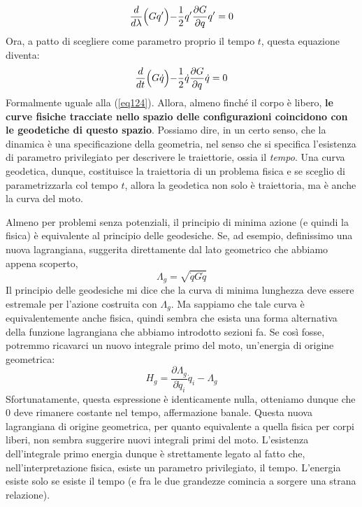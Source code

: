 \documentclass[a4paper,openany]{article}
\begin{document}
	\begin{equation}\label{key}\dfrac{d}{d\lambda}\Bigl(Gq'\Bigl)-\dfrac{1}{2}q'\dfrac{\partial G}{\partial q}q' =0
	\end{equation}
	Ora, a patto di scegliere come parametro proprio il tempo $t$, questa equazione diventa:
	\begin{equation}\label{key}\dfrac{d}{dt}\Bigl(G\dot{q}\Bigl)-\dfrac{1}{2}\dot{q}\dfrac{\partial G}{\partial q}\dot{q} =0
	\end{equation}
	Formalmente uguale alla (\ref{eq124}). Allora, almeno finché il corpo è libero, \textbf{le curve fisiche tracciate nello spazio delle configurazioni coincidono con le geodetiche di questo spazio}. Possiamo dire, in un certo senso, che la dinamica è una specificazione della geometria, nel senso che si specifica l'esistenza di parametro privilegiato per descrivere le traiettorie, ossia il \textit{tempo}. Una curva geodetica, dunque, costituisce la traiettoria di un problema fisica e se sceglio di parametrizzarla col tempo $t$, allora la geodetica non solo è traiettoria, ma è anche la curva del moto.
	
	
	Almeno per problemi senza potenziali, il principio di minima azione (e quindi la fisica) è equivalente al principio delle geodesiche. Se, ad esempio, definissimo una nuova lagrangiana, suggerita direttamente dal lato geometrico che abbiamo appena scoperto,
	\begin{equation}\label{key}
		\Lambda_{g} = \sqrt{\dot{q}G\dot{q}}
	\end{equation}
	Il principio delle geodesiche mi dice che la curva di minima lunghezza deve essere estremale per l'azione costruita con $\Lambda_g$. Ma sappiamo che tale curva è equivalentemente anche fisica, quindi sembra che esista una forma alternativa della funzione lagrangiana che abbiamo introdotto sezioni fa. Se così fosse, potremmo ricavarci un nuovo integrale primo del moto, un'energia di origine geometrica:
	\begin{equation}\label{key}
		H_{g} = \dfrac{\partial \Lambda_g}{\partial \dot{q}_i}\dot{q}_i - \Lambda_g
	\end{equation}
	Sfortunatamente, questa espressione è identicamente nulla, otteniamo dunque che $0$ deve rimanere costante nel tempo, affermazione banale. Questa nuova lagrangiana di origine geometrica, per quanto equivalente a quella fisica per corpi liberi, non sembra suggerire nuovi integrali primi del moto. L'esistenza dell'integrale primo energia dunque è strettamente legato al fatto che, nell'interpretazione fisica, esiste un parametro privilegiato, il tempo. L'energia esiste solo se esiste il tempo (e fra le due grandezze comincia a sorgere una strana relazione).
\end{document}
